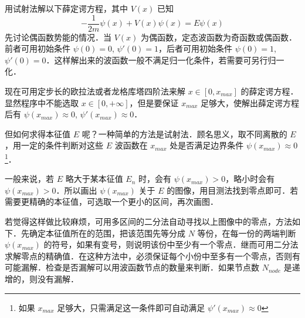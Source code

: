 用试射法解以下薛定谔方程，其中 $V(x)$ 已知
\begin{equation}
-\frac{1}{2m}\psi(x) + V(x)\psi(x) = E \psi(x)
\end{equation}
先讨论偶函数势能的情况．当 $V(x)$ 为偶函数，定态波函数为奇函数或偶函数．前者可用初始条件 $\psi(0)=0$, $\psi'(0)=1$，后者可用初始条件 $\psi(0)=1$, $\psi'(0)=0$．这样解出来的波函数一般不满足归一化条件，若需要可另行归一化．

现在可用定步长的欧拉法或者龙格库塔四阶法来解 $x\in [0,x_{max}]$ 的薛定谔方程．显然程序中不能选取 $x\in [0,+\infty]$，但是要保证 $x_{max}$ 足够大，使解出薛定谔方程后有 $\psi(x_{max})\approx 0$, $\psi'(x_{max})\approx 0$．

但如何求得本征值 $E$ 呢？一种简单的方法是试射法．顾名思义，取不同离散的 $E$，用一定的条件判断对这些 $E$ 波函数在 $x_{max}$ 处是否满足边界条件 $\psi(x_{max})\approx 0$\footnote{如果 $x_{max}$ 足够大，只需满足这一条件即可自动满足 $\psi'(x_{max})\approx 0$}．

一般来说，若 $E$ 略大于某本征值 $E_n$ 时，会有 $\psi(x_{max})>0$，略小时会有 $\psi(x_{max})>0$．所以画出 $\psi(x_{max})$ 关于 $E$ 的图像，用目测法找到零点即可．若需要更精确的本征值，可选取一个更小的区间，再次画图．

若觉得这样做比较麻烦，可用多区间的二分法自动寻找以上图像中的零点，方法如下．先确定本征值所在的范围，把该范围先等分成 $N$ 等份，在每一份的两端判断 $\psi(x_{max})$ 的符号，如果有变号，则说明该份中至少有一个零点．继而可用二分法求解零点的精确值．在这种方法中，必须保证每个小份中至多有一个零点，否则有可能漏解．检查是否漏解可以用波函数节点的数量来判断．如果节点数 $N_{node}$ 是递增的，则没有漏解．